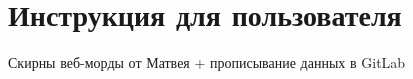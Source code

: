 \section{Инструкция для пользователя}
\label{sec:user}

Скирны веб-морды от Матвея + прописывание данных в GitLab
